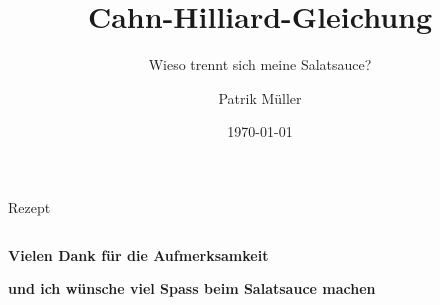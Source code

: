 \documentclass[ngerman, aspectratio=169, xcolor={rgb}]{beamer}
\title{Cahn-Hilliard-Gleichung}
\subtitle{Wieso trennt sich meine Salatsauce?}
\author{Patrik Müller}
\date{\today}
\begin{document}
\begin{frame}
	\titlepage
\end{frame}

\begin{frame}{Rezept}
	\tableofcontents
\end{frame}
%



% 




\appendix
\begin{frame}
\centering
\Large
$ $

\textbf{Vielen Dank für die Aufmerksamkeit}

\textbf{und ich wünsche viel Spass beim Salatsauce machen}
\end{frame}
\end{document}
